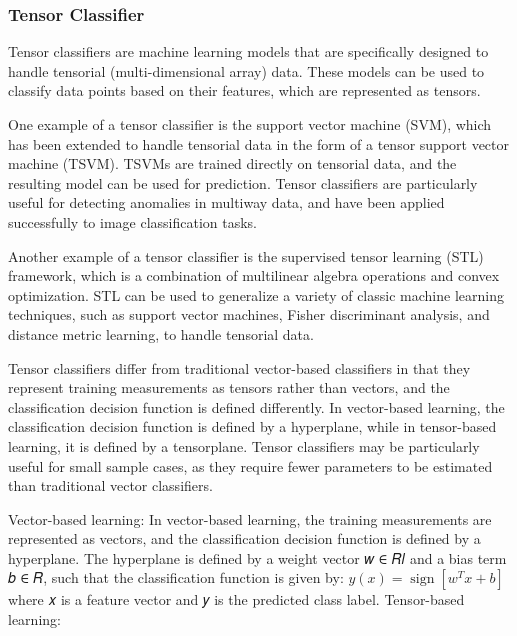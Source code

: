 \documentclass{article}
\theoremstyle{mytheoremstyle}
\theoremstyle{mytheoremstyle}
\theoremstyle{myproblemstyle}
\begin{document}
\subsubsection{Tensor Classifier}

\begin{definition}
	Tensor classifiers are machine learning models that are specifically designed to handle tensorial (multi-dimensional array) data. These models can be used to classify data points based on their features, which are represented as tensors.
\end{definition}

One example of a tensor classifier is the support vector machine (SVM), which has been extended to handle tensorial data in the form of a tensor support vector machine (TSVM). TSVMs are trained directly on tensorial data, and the resulting model can be used for prediction. Tensor classifiers are particularly useful for detecting anomalies in multiway data, and have been applied successfully to image classification tasks.

Another example of a tensor classifier is the supervised tensor learning (STL) framework, which is a combination of multilinear algebra operations and convex optimization. STL can be used to generalize a variety of classic machine learning techniques, such as support vector machines, Fisher discriminant analysis, and distance metric learning, to handle tensorial data.

Tensor classifiers differ from traditional vector-based classifiers in that they represent training measurements as tensors rather than vectors, and the classification decision function is defined differently. In vector-based learning, the classification decision function is defined by a hyperplane, while in tensor-based learning, it is defined by a tensorplane. Tensor classifiers may be particularly useful for small sample cases, as they require fewer parameters to be estimated than traditional vector classifiers.

Vector-based learning:
In vector-based learning, the training measurements are represented as vectors, and the classification decision function is defined by a hyperplane. The hyperplane is defined by a weight vector 𝑤 ∈ 𝑅𝑙 and a bias term 𝑏 ∈ 𝑅, such that the classification function is given by:
\begin{math}
	y(x) = \operatorname{sign}\left[w^T x + b\right]
\end{math}
where 𝑥 is a feature vector and 𝑦 is the predicted class label.
Tensor-based learning:
\end{document}
